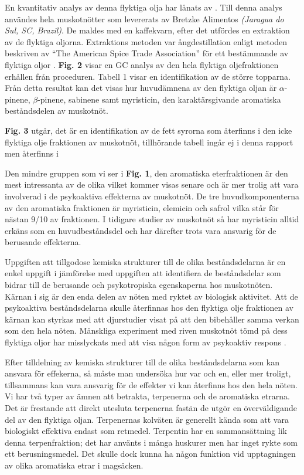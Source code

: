 \documentclass{theme/franska}
\begin{document}
En kvantitativ analys av denna flyktiga olja har lånats av \cite{spricigo1999extraction}.
Till denna analys användes hela muskotnötter som levererats av Bretzke Alimentos \textit{(Jaragua do Sul, SC, Brazil)}. De maldes med en kaffekvarn, efter det utfördes
en extraktion av de flyktiga oljorna. Extraktions metoden var ångdestillation enligt metoden beskriven av ``The American Spice Trade Association'' för ett bestämmande av flyktiga oljor
\cite[citerad av Ferreira]{spricigo1999extraction}.
\textbf{Fig. 2} visar en GC analys av den hela flyktiga oljefraktionen erhållen från proceduren. Tabell 1 visar en identifikation av de större topparna.
Från detta resultat kan det visas hur huvudämnena av den flyktiga oljan är $\alpha$-pinene, $\beta$-pinene, sabinene samt myristicin, den karaktärsgivande aromatiska beståndsdelen av muskotnöt.

\textbf{Fig. 3} utgår, det är en identifikation av de fett syrorna som återfinns i den icke flyktiga olje fraktionen av muskotnöt, tillhörande tabell ingår ej i denna rapport men återfinns i \cite[s.258]{spricigo1999extraction}

Den mindre gruppen som vi ser i \textbf{Fig. 1}, den aromatiska
eterfraktionen är den mest intressanta av de olika vilket kommer visas senare
och är mer trolig att vara involverad i de psykoaktiva effekterna av
muskotnöt.
De tre huvudkomponenterna av den aromatiska fraktionen är myristicin, elemicin
och safrol vilka står för nästan 9/10 av fraktionen.
I tidigare studier av muskotnöt så har myristicin alltid erkäns som en
huvudbeståndsdel och har därefter trots vara ansvarig för de berusande effekterna.

Uppgiften att tillgodose kemiska strukturer till de olika beståndsdelarna är
en enkel uppgift i jämförelse med uppgiften att identifiera de
beståndsdelar som bidrar till de berusande och psykotropiska egenskaperna hos muskotnöten.
Kärnan i sig är den enda delen av nöten med ryktet av biologisk aktivitet.
Att de psykoaktiva beståndsdelarna skulle återfinnas hos den flyktiga olje fraktionen av kärnan kan styrkas med att djurstudier visat på att den bibehåller samma verkan som den hela nöten.
Mänskliga experiment med riven muskotnöt tömd på dess flyktiga oljor har
misslyckats med att visa någon form av psykoaktiv respons \cite{truitt}.

Efter tilldelning av kemiska strukturer till de olika beståndsdelarna
som kan ansvara för effekerna, så måste man undersöka hur var och en, eller
mer troligt, tillsammans kan vara ansvarig för de effekter vi kan återfinns hos den hela nöten.
Vi har två typer av ämnen att betrakta, terpenerna och de aromatiska etrarna.
Det är frestande att direkt utesluta terpenerna fastän de utgör en överväldigande
del av den flyktiga oljan. Terpenernas kolväten är generellt kända som att vara
biologiskt effektiva endast som retmedel.
Terpentin har en sammansättning lik denna terpenfraktion; det har använts
i många huskurer men har inget rykte som ett berusningsmedel.
Det skulle dock kunna ha någon funktion vid upptagningen av olika aromatiska etrar i magsäcken.
\end{document}
